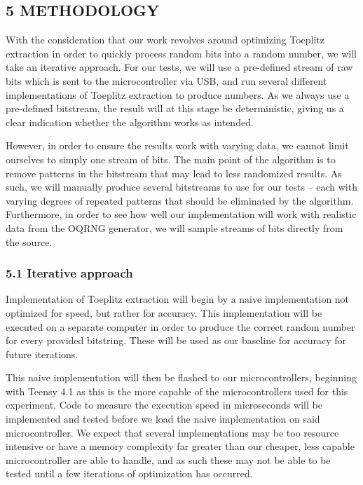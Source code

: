 \subsection{5 METHODOLOGY}\label{methodology}

With the consideration that our work revolves around optimizing Toeplitz extraction in order to quickly process random bits into a random number, we will take an iterative approach. For our tests, we will use a pre-defined stream of raw bits which is sent to the microcontroller via USB, and run several different implementations of Toeplitz extraction to produce numbers. As we always use a pre-defined bitstream, the result will at this stage be deterministic, giving us a clear indication whether the algorithm works as intended.

However, in order to ensure the results work with varying data, we cannot limit ourselves to simply one stream of bits. The main point of the algorithm is to remove patterns in the bitstream that may lead to less randomized results. As such, we will manually produce several bitstreams to use for our tests -- each with varying degrees of repeated patterns that should be eliminated by the algorithm. Furthermore, in order to see how well our implementation will work with realistic data from the OQRNG generator, we will sample streams of bits directly from the source.

\subsubsection{5.1 Iterative approach}\label{iterative-approach}

Implementation of Toeplitz extraction will begin by a naive implementation not optimized for speed, but rather for accuracy. This implementation will be executed on a separate computer in order to produce the correct random number for every provided bitstring. These will be used as our baseline for accuracy for future iterations.

This naive implementation will then be flashed to our microcontrollers, beginning with Teensy 4.1 as this is the more capable of the microcontrollers used for this experiment. Code to measure the execution speed in microseconds will be implemented and tested before we load the naive implementation on said microcontroller. We expect that several implementations may be too resource intensive or have a memory complexity far greater than our cheaper, less capable microcontroller are able to handle, and as such these may not be able to be tested until a few iterations of optimization has occurred.

